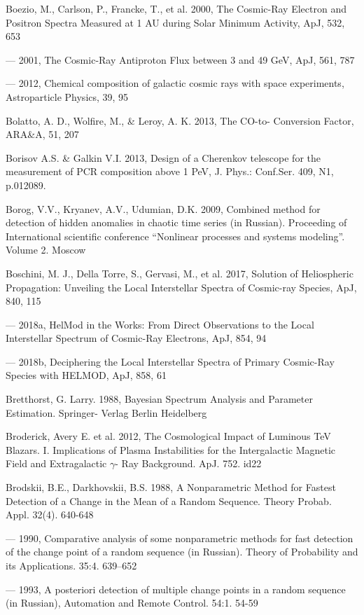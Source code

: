 Boezio, M., Carlson, P., Francke, T., et al. 2000, The Cosmic-Ray Electron and Positron Spectra Measured at 1 AU during Solar Minimum Activity, ApJ, 532, 653

--- 2001, The Cosmic-Ray Antiproton Flux between 3 and 49 GeV, ApJ, 561, 787

--- 2012, Chemical composition of galactic cosmic rays with space experiments, Astroparticle Physics, 39, 95

Bolatto, A. D., Wolfire, M., \& Leroy, A. K. 2013, The CO-to-\htwo{} Conversion Factor, ARA\&A, 51, 207

Borisov A.S. \& Galkin V.I. 2013, Design of a Cherenkov telescope for the measurement of PCR composition above 1 PeV, J. Phys.: Conf.Ser. 409, N1, p.012089.

Borog, V.V., Kryanev, A.V., Udumian, D.K. 2009, Combined method for detection of hidden anomalies in chaotic time series (in Russian). Proceeding of International scientific conference ``Nonlinear processes and systems modeling''. Volume 2. Moscow

Boschini, M. J., Della Torre, S., Gervasi, M., et al. 2017, Solution of Heliospheric Propagation: Unveiling the Local Interstellar Spectra of Cosmic-ray Species, ApJ, 840, 115

--- 2018a, HelMod in the Works: From Direct Observations to the Local Interstellar Spectrum of Cosmic-Ray Electrons, ApJ, 854, 94

--- 2018b, Deciphering the Local Interstellar Spectra of Primary Cosmic-Ray Species with HELMOD, ApJ, 858, 61

Bretthorst, G. Larry. 1988, Bayesian Spectrum Analysis and Parameter Estimation. Springer- Verlag Berlin Heidelberg

Broderick, Avery E. et al. 2012, The Cosmological Impact of Luminous TeV Blazars. I. Implications of Plasma Instabilities for the Intergalactic Magnetic Field and Extragalactic $\gamma$- Ray Background. ApJ. 752. id22

Brodskii, B.E., Darkhovskii, B.S. 1988, A Nonparametric Method for Fastest Detection of a Change in the Mean of a Random Sequence. Theory Probab. Appl. 32(4). 640-648

--- 1990, Comparative analysis of some nonparametric methods for fast detection of the change point of a random sequence (in Russian). Theory of Probability and its Applications. 35:4. 639--652

--- 1993, A posteriori detection of multiple change points in a random sequence (in Russian), Automation and Remote Control. 54:1. 54-59

